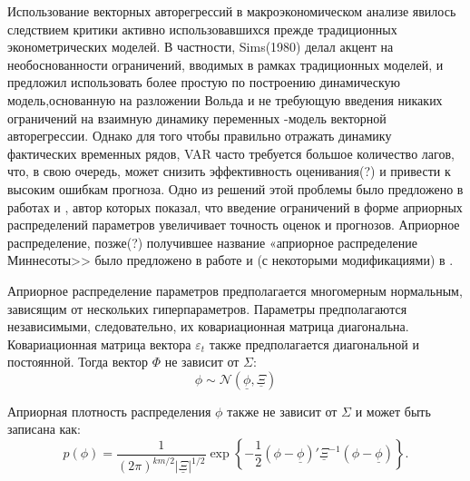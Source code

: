 \documentclass[11pt]{article} %
\newcommand{\cN}{\mathcal{N}}
\newcommand{\prior}{\underline}
\begin{document}
Использование векторных авторегрессий в макроэкономическом анализе явилось следствием критики активно использовавшихся прежде традиционных эконометрических моделей. В частности, Sims(1980) делал акцент на необоснованности ограничений, вводимых в рамках традиционных моделей, и предложил использовать более простую по построению динамическую модель,основанную на разложении Вольда и не требующую введения никаких ограничений на взаимную динамику переменных -модель векторной авторегрессии. Однако для того чтобы правильно отражать динамику фактических временных рядов, VAR часто требуется большое количество лагов, что, в свою очередь, может снизить эффективность оценивания(?) и привести к высоким ошибкам прогноза. 
Одно из решений этой проблемы было предложено в работах  \cite{litterman_1979} и  \cite{litterman_1980}, автор которых показал, что введение ограничений в форме априорных распределений параметров увеличивает точность оценок и прогнозов. Априорное распределение, позже(?) получившее название «априорное распределение Миннесоты>> было предложено в работе  \cite{litterman_1986_forecasting} и (с некоторыми модификациями) в \cite{doan_litterman_sims_1984_forecasting}.



Априорное распределение параметров предполагается многомерным нормальным, зависящим от нескольких гиперпараметров. Параметры предполагаются независимыми, следовательно, их ковариационная матрица диагональна. Ковариационная матрица вектора $\varepsilon_t$ также предполагается диагональной и постоянной.
Тогда вектор $\Phi$ не зависит от $\Sigma$:
\begin{equation}
\phi\sim \cN(\prior \phi, \prior \Xi)
\end{equation}

Априорная плотность распределения $\phi$ также не зависит от $\Sigma$ и может быть записана как:
\begin{equation}
p(\phi)=\frac{1}{(2\pi)^{km/2}|\prior\Xi|^{1/2}} \exp \left\lbrace-\frac{1}{2}(\phi-\prior \phi)'\prior\Xi^{-1}(\phi-\prior \phi ) \right\rbrace.
\end{equation}
\end{document}

